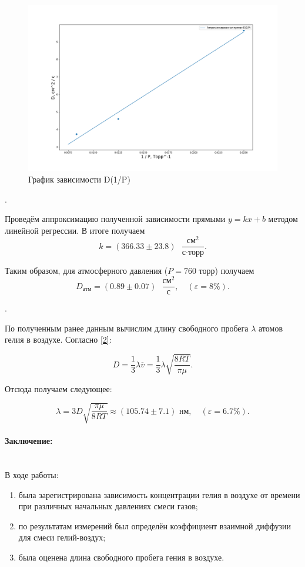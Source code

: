 \documentclass[a4paper, 12pt]{article}
\newcommand{\parag}[1]{\paragraph*{#1:}}
\newcounter{Points}
\newcommand{\point}{\arabic{Points}. \addtocounter{Points}{1}}
\begin{document}
\begin{figure}[H]
    \centering
	\includegraphics[width=\linewidth]{D_from_one_over_p_graph.png}
	\caption{График зависимости D(1/P)}
	\label{D_from_one_over_p_graph}
\end{figure}

\point Проведём аппроксимацию полученной зависимости прямыми $ y =kx + b $ методом линейной регрессии. В итоге получаем \[ k = (366.33 \pm 23.8) \text{ } \frac{\text{см}^2}{\text{с}\cdot\text{торр}}. \]

Таким образом, для атмосферного давления ($ P=760 $ торр) получаем \[{D_\text{атм} = (0.89\pm0.07) \text{ } \frac{\text{см}^2}{\text{с}}}, \quad (\varepsilon = 8\%). \]

\point По полученным ранее данным вычислим длину свободного пробега $ \lambda $ атомов гелия в воздухе. Согласно \eqref{2}:

\[ D = \frac{1}{3}\lambda \overline{v} = \frac{1}{3}\lambda\sqrt{\frac{8RT}{\pi\mu}}. \]

Отсюда получаем следующее:

\[{\lambda = 3D\sqrt{\dfrac{\pi\mu}{8RT}} \approx (105.74 \pm 7.1) \text{ нм}}, \quad (\varepsilon = 6.7\%).\]

\parag {Заключение} ~\\
В ходе работы:

\begin{enumerate}
	\item была зарегистрирована зависимость концентрации гелия в воздухе от времени при различных начальных давлениях смеси газов;
	\item по результатам измерений был определён коэффициент взаимной диффузии для смеси гелий-воздух;
	\item была оценена длина свободного пробега гения в воздухе.
\end{enumerate}
\end{document}
